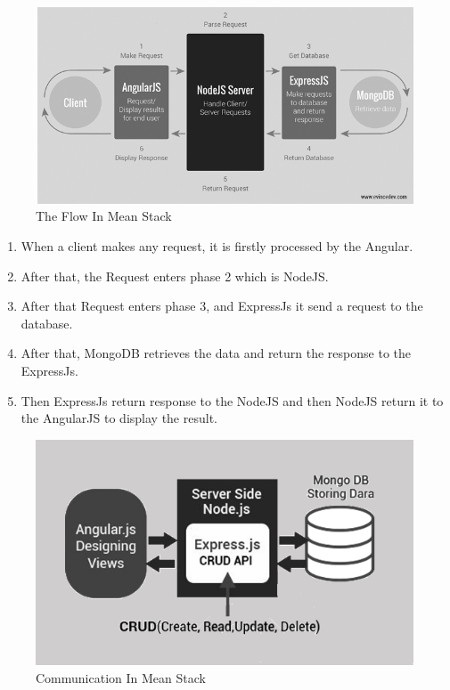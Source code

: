 \begin{figure}[!ht]
      \center
      \includegraphics[scale=0.50]{assets/meanphases.png}
      \caption{The Flow In Mean Stack}
      \label{fig:mean}
\end{figure}
\begin{enumerate}
      \item 
      When a client makes any request, it is firstly processed by the Angular.
      \item 
      After that, the Request enters phase 2 which is NodeJS.
      \item 
      After that Request enters phase 3, and ExpressJs it send a request to the database.
      \item 
      After that, MongoDB retrieves the data and return the response to the ExpressJs.
      \item 
      Then ExpressJs return response to the NodeJS and then NodeJS return it to the AngularJS to display the result.
\end{enumerate}

\begin{figure}[!ht]
      \center
      \includegraphics[scale=0.55]{assets/meanarchdesc.png}
      \caption{Communication In Mean Stack}
      \label{fig:mean}
\end{figure}

